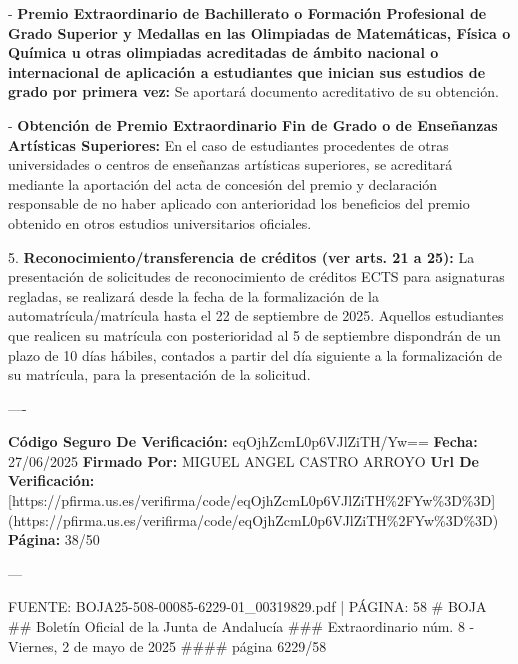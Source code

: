 \documentclass{article}
\begin{document}
\begin{itemize}
\begin{itemize}
\begin{scriptsize}
                  - \textbf{Premio Extraordinario de Bachillerato o Formación Profesional de Grado Superior y Medallas en las Olimpiadas de Matemáticas, Física o Química u otras olimpiadas acreditadas de ámbito nacional o internacional de aplicación a estudiantes que inician sus estudios de grado por primera vez:} Se aportará documento acreditativo de su obtención.

                  - \textbf{Obtención de Premio Extraordinario Fin de Grado o de Enseñanzas Artísticas Superiores:} En el caso de estudiantes procedentes de otras universidades o centros de enseñanzas artísticas superiores, se acreditará mediante la aportación del acta de concesión del premio y declaración responsable de no haber aplicado con anterioridad los beneficios del premio obtenido en otros estudios universitarios oficiales.

                  5. \textbf{Reconocimiento/transferencia de créditos (ver arts. 21 a 25):} La presentación de solicitudes de reconocimiento de créditos ECTS para asignaturas regladas, se realizará desde la fecha de la formalización de la automatrícula/matrícula hasta el 22 de septiembre de 2025. Aquellos estudiantes que realicen su matrícula con posterioridad al 5 de septiembre dispondrán de un plazo de 10 días hábiles, contados a partir del día siguiente a la formalización de su matrícula, para la presentación de la solicitud.

                  ----

                  \textbf{Código Seguro De Verificación:} eqOjhZcmL0p6VJlZiTH/Yw==
                  \textbf{Fecha:} 27/06/2025
                  \textbf{Firmado Por:} MIGUEL ANGEL CASTRO ARROYO
                  \textbf{Url De Verificación:} [https://pfirma.us.es/verifirma/code/eqOjhZcmL0p6VJlZiTH\%2FYw\%3D\%3D](https://pfirma.us.es/verifirma/code/eqOjhZcmL0p6VJlZiTH\%2FYw\%3D\%3D)
                  \textbf{Página:} 38/50

                  ---

                  FUENTE: BOJA25-508-00085-6229-01\_00319829.pdf | PÁGINA: 58
                  \# BOJA
                  \#\# Boletín Oficial de la Junta de Andalucía
                  \#\#\# Extraordinario núm. 8 - Viernes, 2 de mayo de 2025
                  \#\#\#\# página 6229/58


\end{scriptsize}
\end{itemize}
\end{itemize}
\end{document}
